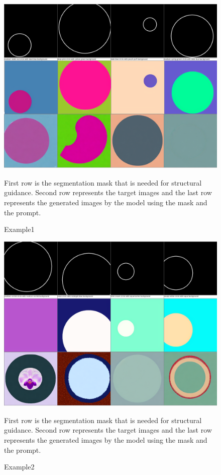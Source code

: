 \documentclass[12pt,a4paper]{report}
\begin{document}
\begin{figure}
    \centering
    \includegraphics[width=1\linewidth]{t1e0.png}
    \caption{Example1}
    First row is the segmentation mask that is needed for structural guidance. Second row represents the target images and the last row represents the generated images by the model using the mask and the prompt.
\end{figure}

\begin{figure}
    \centering
    \includegraphics[width=1\linewidth]{t1e2.png}
    \caption{Example2}
        First row is the segmentation mask that is needed for structural guidance. Second row represents the target images and the last row represents the generated images by the model using the mask and the prompt.
\end{figure}
\end{document}

